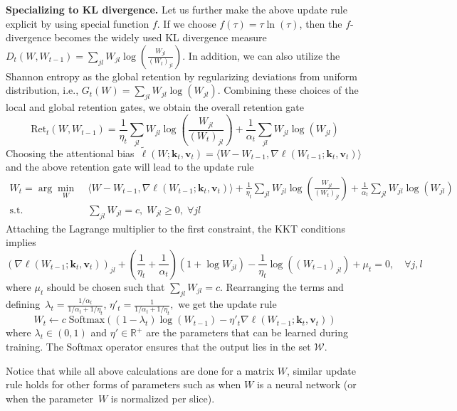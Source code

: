 \documentclass{article}
\newcommand{\vk}[0]{\mathbf{k}}
\newcommand{\vvv}[0]{\mathbf{v}}
\newcommand{\cW}[0]{\mathcal{W}}
\theoremstyle{plain}
\theoremstyle{definition}
\theoremstyle{remark}
\begin{document}
\vspace{0.2cm}



\textbf{Specializing to KL divergence.} Let us further make the above update rule explicit by using special  function $f$. If we choose $f(\tau) = \tau \ln(\tau)$, then the $f$-divergence becomes the widely used KL divergence measure~$D_t(W,W_{t-1}) = \sum_{jl} W_{jl}\log\left(\frac{W_{jl}}{(W_t)_{jl}}\right)$. 
In addition, we can also utilize the Shannon entropy as the global retention by regularizing deviations from uniform distribution, i.e., $G_t(W) =  \sum_{jl}W_{jl}\log(W_{jl})$.  
Combining these choices of the local and global retention gates, we obtain the overall retention gate
\[
\mbox{Ret}_t(W,W_{t-1}) = \frac{1}{\eta_t} \sum_{jl} W_{jl}\log\left(\frac{W_{jl}}{(W_t)_{jl}}\right) + \frac{1}{\alpha_t} \sum_{jl}W_{jl}\log(W_{jl})
\]
Choosing the attentional bias~$\widetilde{\ell}(W;\vk_t, \vvv_t) = \langle W-W_{t-1}, \nabla \ell(W_{t-1};\vk_t, \vvv_t)\rangle$ and the above retention gate will lead to the  update rule
\begin{align}
W_{t} = \arg\min_{W} \;&\langle W-W_{t-1}, \nabla \ell(W_{t-1};\vk_t, \vvv_t)\rangle +  \frac{1}{\eta_t} \sum_{jl} W_{jl}\log\left(\frac{W_{jl}}{(W_t)_{jl}}\right) + \frac{1}{\alpha_t} \sum_{jl}W_{jl}\log(W_{jl}) \\
\textrm{s.t.}\quad & \sum_{jl}W_{jl} = c,\; W_{jl} \geq 0, \;\forall jl
\end{align}
Attaching the Lagrange multiplier to the first constraint, the KKT conditions implies
\[
\left(\nabla \ell(W_{t-1};\vk_t, \vvv_t)\right)_{jl} +\left(\frac{1}{\eta_t} + \frac{1}{\alpha_t}\right)\left(1+ \log W_{jl}\right) - \frac{1}{\eta_t} \log\left((W_{t-1})_{jl}\right) + \mu_t = 0,\quad \forall j,l
\]
where $\mu_t$ should be chosen such that $ \sum_{jl}W_{jl} = c$. Rearranging the terms and defining~$\lambda_t = \frac{1/\alpha_t}{1/\alpha_t + 1/\eta_t}$, $\eta'_t = \frac{1}{1/\alpha_t + 1/\eta_t},$  we get the update rule
\begin{equation}\label{eq:xmodel}
     W_t \leftarrow c \; \mbox{Softmax}\left( (1-\lambda_t) \log(W_{t-1})  - \eta'_t \nabla \ell(W_{t-1};\vk_t, \vvv_t)\right)
\end{equation}
where $\lambda_t \in (0,1)$ and $\eta' \in \mathbb{R}^+$ are the parameters that can be learned during training. The Softmax operator ensures that the output lies in the set $\cW$.  

Notice that while all above calculations are done for a matrix $W$, similar update rule holds for other forms of parameters such as when $W$ is a neural network (or when the parameter~$W$ is normalized per slice).
\end{document}
